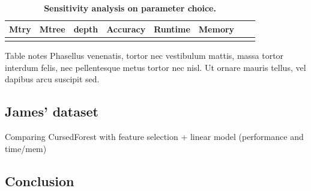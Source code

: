 \documentclass[10pt,letterpaper]{article}
\begin{document}
\begin{table}[!ht]
\caption{
{\bf Sensitivity analysis on parameter choice.}}
\begin{tabular}{|l|l|l|l|l|l|l|l|}
\hline
\bf{Mtry}  & \bf{Mtree} & \bf{depth} & \bf{Accuracy} & \bf{Runtime} & \bf{Memory} \\
\hline
&&&&&\\ \hline
\end{tabular}
\begin{flushleft} 
  Table notes Phasellus venenatis, tortor nec vestibulum mattis, massa tortor interdum felis, nec pellentesque metus
  tortor nec nisl. Ut ornare mauris tellus, vel dapibus arcu suscipit sed.
\end{flushleft}
\label{table2}
\end{table}





\subsection*{James' dataset}
Comparing CursedForest with feature selection + linear model (performance and time/mem) 



\subsection*{Conclusion}
\end{document}
